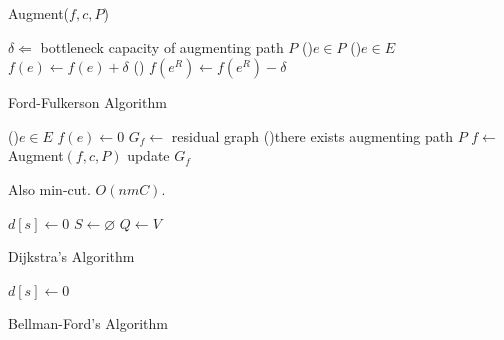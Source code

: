 \documentclass[a4paper]{article}
\begin{document}
\begin{multicols}{2}
\begin{tcolorbox}[title=Network Flow]
    \begin{algorithm}[H]
        \caption{Augment($f,c,P$)}
        $\delta\Leftarrow$ bottleneck capacity of augmenting path $P$\;
        \ForEach(){$e\in P$}{
            \If(){$e\in E$}{
                $f(e)\leftarrow f(e)+\delta$\;
            }
            \Else(){
                $f(e^R)\leftarrow f(e^R)-\delta$\;
            }
        }
        \;
    \end{algorithm}
    \begin{algorithm}[H]
        \caption{Ford-Fulkerson Algorithm}
        \ForEach(){$e\in E$}{
            $f(e)\leftarrow 0$\;
        }
        $G_f\leftarrow$ residual graph\;
        \While(){there exists augmenting path $P$}{
            $f\leftarrow$ Augment$(f,c,P)$\;
            update $G_f$\;
        }
        \;
    \end{algorithm}
    Also min-cut. $O(nmC)$.
\end{tcolorbox}

\begin{tcolorbox}[title=Single Shortest Path]
    \begin{algorithm}[H]
    $d[s]\leftarrow 0$\;
    $S\leftarrow \varnothing$\;
    $Q\leftarrow V$ \;
    \caption{Dijkstra's Algorithm}
    \end{algorithm}
    \begin{algorithm}[H]
        $d[s]\leftarrow 0$\;
        \caption{Bellman-Ford's Algorithm}
    \end{algorithm}
\end{tcolorbox}


\end{multicols}
\end{document}
